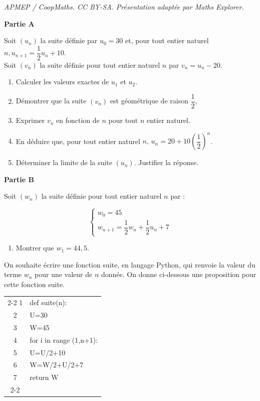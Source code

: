 \documentclass[10pt]{article}
\begin{document}
\noindent\textit{APMEP / CoopMaths. CC BY-SA. Présentation adaptée par Maths Explorer.}\par\medskip
\medskip

\textbf{Partie A}

\medskip

Soit $\left(u_{n}\right)$ la suite définie par $u_{0}=30$ et, pour tout entier naturel $n, u_{n+1}=\dfrac{1}{2} u_{n}+10$.\\
Soit $\left(v_{n}\right)$ la suite définie pour tout entier naturel $n$ par $v_{n}=u_{n}-20$.

\begin{enumerate}
\item Calculer les valeurs exactes de $u_{1}$ et $u_{2}$.
\item Démontrer que la suite $\left(v_{n}\right)$ est géométrique de raison $\dfrac12$,
\item Exprimer $v_{n}$ en fonction de $n$ pour tout $n$ entier naturel.
\item En déduire que, pour tout entier naturel $n,\,  u_{n}=20+10\left(\dfrac{1}{2}\right)^{n}$.
\item Déterminer la limite de la suite $\left(u_{n}\right)$. Justifier la réponse.
\end{enumerate}

\textbf{Partie B}

\medskip

Soit $\left(w_{n}\right)$ la suite définie pour tout entier naturel $n$ par :

\[
\begin{cases}
w_{0}=45 \\
w_{n+1}=\dfrac{1}{2} w_{n}+\dfrac{1}{2} u_{n}+7
\end{cases}
\]

\begin{enumerate}
\item Montrer que $w_{1} = 44,5$.
\end{enumerate}

On souhaite écrire une fonction suite, en langage Python, qui renvoie la valeur du terme $w_{n}$ pour une valeur de $n$ donnée. On donne ci-dessous une proposition pour cette fonction suite.

\begin{center}

\begin{tabular}{c| l|}\cline{2-2}
1&def suite(n):\\
2&\quad U=30\\
3&\quad W=45\\
4&\quad for i in range (1,n+1):\\
5&\quad\quad   U=U/2+10\\
6&\quad\quad  W=W/2+U/2+7\\
7&\quad return W\\ \cline{2-2}

\end{tabular}
\end{center}
\end{document}
